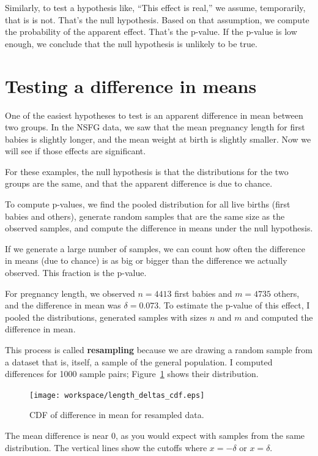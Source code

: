 \documentclass[12pt]{book}
\begin{document}
Similarly, to test a hypothesis like, ``This effect is real,'' we
assume, temporarily, that is is not.  That's the null hypothesis.
Based on that assumption, we compute the probability of the apparent
effect.  That's the p-value.  If the p-value is low enough, we
conclude that the null hypothesis is unlikely to be true.


\section{Testing a difference in means}

One of the easiest hypotheses to test is an apparent difference in mean
between two groups.  In the NSFG data, we saw that the mean pregnancy
length for first babies is slightly longer, and the mean weight at
birth is slightly smaller.  Now we will see if those effects are
significant.

For these examples, the null hypothesis is that the distributions
for the two groups are the same, and that the apparent difference is
due to chance.

To compute p-values, we find the pooled distribution for all live
births (first babies and others), generate random samples that are
the same size as the observed samples, and compute the difference
in means under the null hypothesis.

If we generate a large number of samples, we can count how often the
difference in means (due to chance) is as big or bigger than the
difference we actually observed.  This fraction is the p-value.

For pregnancy length, we observed $n=4413$ first babies and $m=4735$
others, and the difference in mean was $\delta=0.073$.  To estimate
the p-value of this effect, I pooled the distributions, generated
samples with sizes $n$ and $m$ and computed the difference in mean.

This process is called {\bf resampling} because we are drawing a
random sample from a dataset that is, itself, a sample of the general
population.  I computed differences for 1000 sample pairs;
Figure~\ref{length_deltas_cdf} shows their distribution.

\begin{figure}
\centerline{\texttt{[image: workspace/length\_deltas\_cdf.eps]}}
\caption{CDF of difference in mean for resampled data.}
\label{length_deltas_cdf}
\end{figure}

The mean difference is near 0, as you would expect with samples
from the same distribution.  The vertical lines show the cutoffs where
$x=-\delta$ or $x=\delta$.
\end{document}
